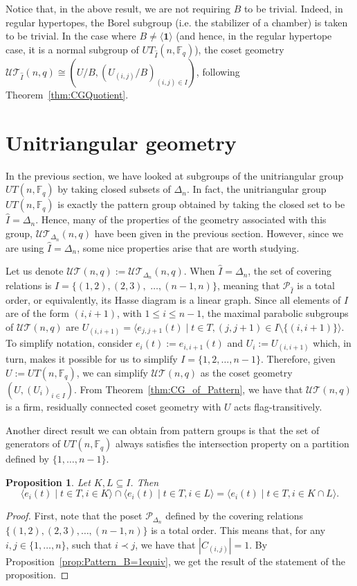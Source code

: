 \documentclass[11pt,letterpaper]{amsart}
\newtheorem{proposition}[theorem]{Proposition}
\newcommand{\TT}{\mathcal{T}}
\newcommand{\PP}{\mathcal{P}}
\newcommand{\FF}{\mathbb{F}}
\newcommand{\UU}{\mathcal{U}}
\begin{document}
Notice that, in the above result, we are not requiring $B$ to be trivial. Indeed, in regular hypertopes, the Borel subgroup (i.e. the stabilizer of a chamber) is taken to be trivial. In the case where $B\neq \langle \textbf{1}\rangle$ (and hence, in the regular hypertope case, it is a normal subgroup of $UT_{\widehat{I}}(n,\FF_q)$), the coset geometry $\UU\TT_{\widehat{I}}(n,q) \cong (U/B, ( U_{(i,j)}/B)_{(i,j)\in I})$, following Theorem~\ref{thm:CGQuotient}.




\section{Unitriangular geometry}\label{sec:UniTriaGeom}

In the previous section, we have looked at subgroups of the unitriangular group $UT(n,\FF_q)$ by taking closed subsets of $\Delta_n$.
In fact, the unitriangular group $UT(n,\FF_q)$ is exactly the pattern group obtained by taking the closed set to be $\widehat{I}=\Delta_n$. Hence, many of the properties of the geometry associated with this group, $\UU\TT_{\Delta_n}(n,q)$ have been given in the previous section. 
However, since we are using $\widehat{I}=\Delta_n$, some nice properties arise that are worth studying.

Let us denote $\UU\TT(n,q):=\UU\TT_{\Delta_n}(n,q)$.
When $\widehat{I}=\Delta_n$, the set of covering relations is $I = \{(1,2),(2,3),$ $\ldots,(n-1,n)\}$, meaning that $\PP_{\widehat{I}}$ is a total order, or equivalently, its Hasse diagram is a linear graph.
Since all elements of $I$ are of the form $(i,i+1)$, with $1\leq i\leq n-1$, the maximal parabolic subgroups of $\UU\TT(n,q)$ are $U_{(i,i+1)}=\langle e_{j,j+1}(t)\mid t\in T, (j,j+1)\in I\setminus\{(i,i+1)\}\rangle$.
To simplify notation, consider $e_i(t):= e_{i,i+1}(t)$ and $U_i := U_{(i,i+1)}$ which, in turn, makes it possible for us to simplify $I=\{1,2,\ldots,n-1\}$.
Therefore, given $U:= UT(n,\FF_q)$, we can simplify $\UU\TT(n,q)$ as the coset geometry $(U,(U_i)_{i\in I})$. From Theorem~\ref{thm:CG_of_Pattern}, we have that $\UU\TT(n,q)$ is a firm, residually connected coset geometry with $U$ acts flag-transitively.

Another direct result we can obtain from pattern groups is that the set of generators of $UT(n,\FF_q)$ always satisfies the intersection property on a partition defined by $\{1,\ldots,n-1\}$.

\begin{proposition}\label{prop:UniT_IP}
Let $K,L\subseteq I$. Then $$\langle e_{i}(t)\mid t\in T, i\in K \rangle \cap \langle e_{i}(t)\mid t\in T, i\in L \rangle = \langle e_{i}(t)\mid t\in T, i\in K\cap L \rangle.$$
\end{proposition}
\begin{proof}
    First, note that the poset $\PP_{\Delta_n}$ defined by the covering relations $\{(1,2),(2,3),\ldots,(n-1,n)\}$ is a total order. This means that, for any $i,j\in \{1,\ldots,n\}$, such that $i\prec j$, we have that $|C_{(i,j)}|=1$. By Proposition~\ref{prop:Pattern_B=1equiv}, we get the result of the statement of the proposition.
\end{proof}
\end{document}
